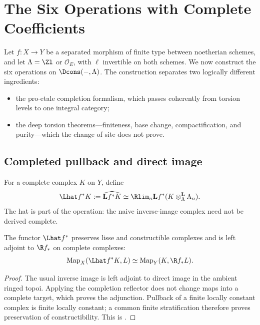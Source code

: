\chapter{The Six Operations with Complete Coefficients}
\label{chap:proetale-six}

Let \(f:X\to Y\) be a separated morphism of finite type between noetherian
schemes, and let \(\Lambda=\Zl\) or \(\mathcal O_E\), with \(\ell\) invertible
on both schemes.  We now construct the six operations on
\(\Dcons(-,\Lambda)\).  The construction separates two logically different
ingredients:
\begin{itemize}
\item the pro-etale completion formalism, which passes coherently from
      torsion levels to one integral category;
\item the deep torsion theorems---finiteness, base change, compactification,
      and purity---which the change of site does not prove.
\end{itemize}

\section{Completed pullback and direct image}

\begin{definition}
\label{def:completed-pullback}
For a complete complex \(K\) on \(Y\), define
\begin{equation}
\label{eq:completed-pullback}
 \Lhat f^*K
   :=\widehat{\mathbf L f^*K}
   \simeq
   \Rlim_n \mathbf L f^*(K\otimes^{\mathbf L}_{\Lambda}\Lambda_n).
\end{equation}
The hat is part of the operation: the naive inverse-image complex need not be
derived complete.
\end{definition}

\begin{proposition}
\label{prop:completed-pullback-adjunction}
The functor \(\Lhat f^*\) preserves lisse and constructible complexes and is
left adjoint to \(\R f_*\) on complete complexes:
\[
 \operatorname{Map}_X(\Lhat f^*K,L)
   \simeq \operatorname{Map}_Y(K,\R f_*L).
\]
\end{proposition}

\begin{proof}
The usual inverse image is left adjoint to direct image in the ambient
ringed topoi.  Applying the completion reflector does not change maps into a
complete target, which proves the adjunction.  Pullback of a finite locally
constant complex is finite locally constant; a common finite stratification
therefore proves preservation of constructibility.  This is
\cite[Lemma~6.5.9]{BhattScholzeProEtale}.
\end{proof}

